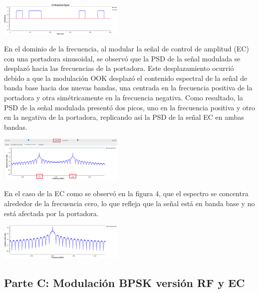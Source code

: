 \documentclass{journal}[IEEEtran, twocolumn]             %
\begin{document}
\begin{multicols}{2}
    \begin{center}
    \includegraphics[width=0.45\textwidth]{figs/F2.png}
    \caption{Figura 2: Gráfica en tiempo EC modulada}
    \label{fig:2}
    \end{center}

En el dominio de la frecuencia, al modular la señal de control de amplitud (EC) con una portadora sinusoidal, se observó que la PSD de la señal modulada se desplazó hacia las frecuencias de la portadora. Este desplazamiento ocurrió debido a que la modulación OOK desplazó el contenido espectral de la señal de banda base hacia dos nuevas bandas, una centrada en la frecuencia positiva de la portadora y otra simétricamente en la frecuencia negativa. Como resultado, la PSD de la señal modulada presentó dos picos, uno en la frecuencia positiva y otro en la negativa de la portadora, replicando así la PSD de la señal EC en ambas bandas.

     \begin{center}
        \includegraphics[width=0.45\textwidth]{figs/F3.png}
        \caption{Figura 3: PSD de la señal RF modulada}
        \label{fig:3}
    \end{center}

En el caso de la EC como se observó en la figura 4, que el espectro se concentra alrededor de la frecuencia cero, lo que refleja que la señal está en banda base y no está afectada por la portadora.

    \begin{center}
        \includegraphics[width=0.45\textwidth]{figs/F4.png}
        \caption{Figura 4: PSD de la EC modulada}
        \label{fig:4}
    \end{center}
   

\subsection{Parte C: Modulación BPSK versión RF y EC}


\end{multicols}
\end{document}
